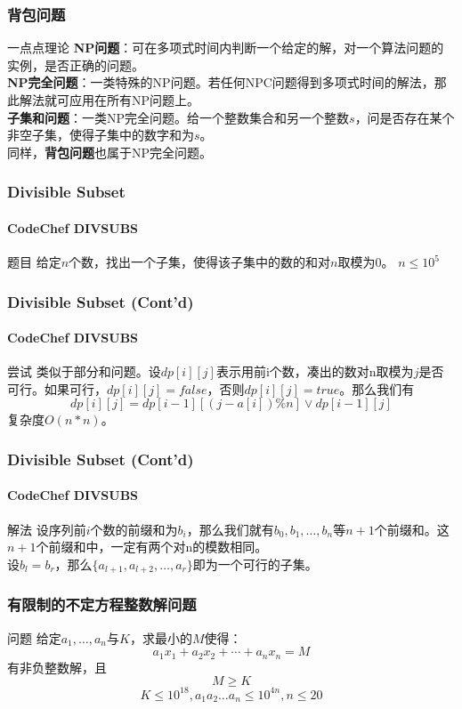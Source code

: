 \documentclass[hyperref={unicode=true}]{beamer}
\begin{document}
  \begin{frame}\frametitle{背包问题}
    \begin{block}{一点点理论}
      {\bf NP问题}：可在多项式时间内判断一个给定的解，对一个算法问题的实例，是否正确的问题。\\
      {\bf NP完全问题}：一类特殊的NP问题。若任何NPC问题得到多项式时间的解法，那此解法就可应用在所有NP问题上。\\
      {\bf 子集和问题}：一类NP完全问题。给一个整数集合和另一个整数$s$，问是否存在某个非空子集，使得子集中的数字和为$s$。\\
      同样，{\bf 背包问题}也属于NP完全问题。
    \end{block}
  \end{frame}
  \begin{frame}\frametitle{Divisible Subset}
    \framesubtitle{CodeChef DIVSUBS}
    \begin{block}{题目}
      给定$n$个数，找出一个子集，使得该子集中的数的和对$n$取模为$0$。
      $n\leq 10^5$
    \end{block}
  \end{frame}
  \begin{frame}\frametitle{Divisible Subset (Cont'd)}
    \framesubtitle{CodeChef DIVSUBS}
    \begin{alertblock}{尝试}
      类似于部分和问题。设$dp[i][j]$表示用前i个数，凑出的数对n取模为$j$是否可行。如果可行，$dp[i][j]=false$，否则$dp[i][j]=true$。那么我们有
      \[dp[i][j] = dp[i-1][(j-a[i])\%n] \vee dp[i-1][j]\]
      复杂度$O(n*n)$。
    \end{alertblock}
  \end{frame}
  \begin{frame}\frametitle{Divisible Subset (Cont'd)}
    \framesubtitle{CodeChef DIVSUBS}
    \begin{exampleblock}{解法}
      设序列前$i$个数的前缀和为$b_i$，那么我们就有$b_0,b_1,\ldots,b_n$等$n+1$个前缀和。这$n+1$个前缀和中，一定有两个对n的模数相同。\\
      设$b_l=b_r$，那么$\{a_{l+1},a_{l+2},\ldots,a_r\}$即为一个可行的子集。
    \end{exampleblock}
  \end{frame}
  \begin{frame}\frametitle{有限制的不定方程整数解问题}
    \begin{block}{问题}
      给定$a_1,\ldots,a_n$与$K$，求最小的$M$使得：
      \[a_1x_1+a_2x_2+ \cdots + a_n x_n=M\]有非负整数解，且
      \[M \ge K\]
      \[K\leq 10^{18},a_1a_2\ldots a_n\leq 10^{4n},n\leq 20\]
    \end{block}
  \end{frame}
\end{document}
